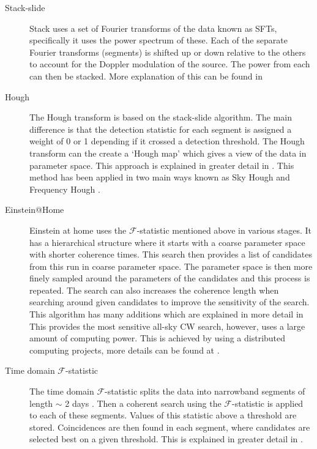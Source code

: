 \begin{description}
	
	\item[Stack-slide] Stack uses a set of Fourier transforms of the data known as \glspl{SFT}, specifically it uses the power spectrum of these. Each of the separate Fourier transforms (segments) is shifted up or down relative to the others to account for the Doppler modulation of the source. The power from each can then be stacked. More explanation of this can be found in \citep{brady2000SearchingPeriodic, cutler2005ImprovedStackslide}  
	
	\item[Hough] The Hough transform is based on the stack-slide algorithm. The main difference is that the detection statistic for each segment is assigned a weight of 0 or 1 depending if it crossed a detection threshold. The Hough transform can the create a `Hough map' which gives a view of the data in parameter space. This approach is explained in greater detail in \citep{krishnan2004HoughTransform,antonucci2008DetectionPeriodic}. 
	This method has been applied in two main ways known as Sky Hough \citep{krishnan2004HoughTransform}and Frequency Hough \citep{antonucci2008DetectionPeriodic,astone2014MethodAllsky}.
	
	\item[Einstein@Home] Einstein at home uses the $\mathcal{F}$-statistic mentioned above in various stages. It has a hierarchical structure where it starts with a coarse parameter space with shorter coherence times. This search then provides a list of candidates from this run in coarse parameter space. The parameter space is then more finely sampled around the parameters of the candidates and this process is repeated. The search can also increases the coherence length when searching around given candidates to improve the sensitivity of the search. This algorithm has many additions which are explained in more detail in \citep{singh2016ResultsAllsky,papa2016HierarchicalFollowup,walsh2016ComparisonMethods}
	This provides the most sensitive all-sky \gls{CW} search, however, uses a large amount of computing power. This is achieved by using a distributed computing projects, more details can be found at \citep{EinsteinHome}. 
	
	\item[Time domain $\mathcal{F}$-statistic] The time domain $\mathcal{F}$-statistic splits the data into narrowband segments of length $\sim$ 2 days \citep{walsh2016ComparisonMethods}. Then a coherent search using the $\mathcal{F}$-statistic is applied to each of these segments. Values of this statistic above a threshold are stored. Coincidences are then found in each segment, where candidates are selected best on a given threshold. This is explained in greater detail in \citep{aasi2014ImplementationTextdollar,walsh2016ComparisonMethods}.
	

\end{description}
